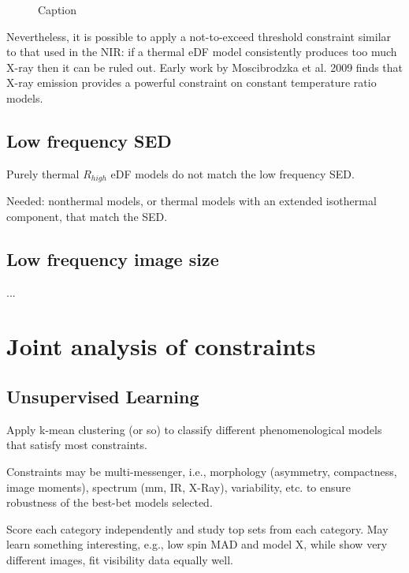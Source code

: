 \documentclass[twocolumn,tighten]{aastex63}
\newcommand\<{{\langle}}
\renewcommand\>{{\rangle}} %
\begin{document}
\begin{figure}
    \centering
    \caption{Caption}
    \label{fig:SEDexamp}
\end{figure}

Nevertheless, it is possible to apply a not-to-exceed threshold constraint similar to that used in the NIR: if a thermal eDF model consistently produces too much X-ray then it can be ruled out.  Early work by Moscibrodzka et al. 2009 finds that X-ray emission provides a powerful constraint on constant temperature ratio models.

\subsection{Low frequency SED}

Purely thermal $R_{high}$ eDF models do not match the low frequency SED.

Needed: nonthermal models, or thermal models with an extended isothermal component, that match the SED.

\subsection{Low frequency image size}
...

\section{Joint analysis of constraints}
\subsection{Unsupervised Learning}

Apply k-mean clustering (or so) to classify different phenomenological models that satisfy most constraints.

Constraints may be multi-messenger, i.e., morphology (asymmetry, compactness, image moments), spectrum (mm, IR, X-Ray), variability, etc. to ensure robustness of the best-bet models selected.

Score each category independently and study top sets from each category.  May learn something interesting, e.g., low spin MAD and model X, while show very different images, fit visibility data equally well.
\end{document}
